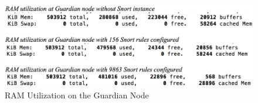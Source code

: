 \begin{figure}
    \centering
    \includegraphics[width=0.85\columnwidth]{figs/SnortRam.png}
    \caption{RAM Utilization on the Guardian Node}
    \label{fig:ramutil}
\end{figure}

